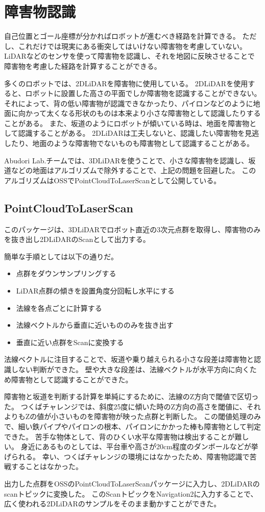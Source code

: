 \section{障害物認識}
自己位置とゴール座標が分かればロボットが進むべき経路を計算できる。
ただし、これだけでは現実にある衝突してはいけない障害物を考慮していない。
LiDARなどのセンサを使って障害物を認識し、それを地図に反映させることで障害物を考慮した経路を計算することができる。

多くのロボットでは、2DLiDARを障害物に使用している。
2DLiDARを使用すると、ロボットに設置した高さの平面でしか障害物を認識することができない。
それによって、背の低い障害物が認識できなかったり、パイロンなどのように地面に向かって太くなる形状のものは本来より小さな障害物として認識したりすることがある。
また、坂道のようにロボットが傾いている時は、地面を障害物として認識することがある。
2DLiDARは工夫しないと、認識したい障害物を見逃したり、地面のような障害物でないものも障害物として認識することがある。

Abudori Lab.チームでは、3DLiDARを使うことで、小さな障害物を認識し、坂道などの地面はアルゴリズムで除外することで、上記の問題を回避した。
このアルゴリズムはOSSでPointCloudToLaserScanとして公開している。

\subsection{PointCloudToLaserScan}
このパッケージは、3DLiDARでロボット直近の3次元点群を取得し、障害物のみを抜き出し2DLiDARのScanとして出力する。

簡単な手順としては以下の通りだ。
\begin{itemize}
    \item 点群をダウンサンプリングする
    \item LiDAR点群の傾きを設置角度分回転し水平にする
    \item 法線を各点ごとに計算する
    \item 法線ベクトルから垂直に近いもののみを抜き出す
    \item 垂直に近い点群をScanに変換する
\end{itemize}

法線ベクトルに注目することで、坂道や乗り越えられる小さな段差は障害物と認識しない判断ができた。
壁や大きな段差は、法線ベクトルが水平方向に向くため障害物として認識することができた。

障害物と坂道を判断する計算を単純にするために、法線のZ方向で閾値で区切った。
つくばチャレンジでは、斜度25度に傾いた時のZ方向の高さを閾値に、それよりもZの値が小さいものを障害物が映った点群と判断した。
この閾値処理のみで、細い鉄パイプやパイロンの根本、パイロンにかかった棒も障害物として判定できた。
苦手な物体として、背のひくい水平な障害物は検出することが難しい。
身近にあるものとしては、平台車や高さが20cm程度のダンボールなどが挙げられる。
幸い、つくばチャレンジの環境にはなかったため、障害物認識で苦戦することはなかった。

出力した点群をOSSのPointCloudToLaserScanパッケージに入力し、2DLiDARのscanトピックに変換した。
このScanトピックをNavigation2に入力することで、広く使われる2DLiDARのサンプルをそのまま動かすことができた。
